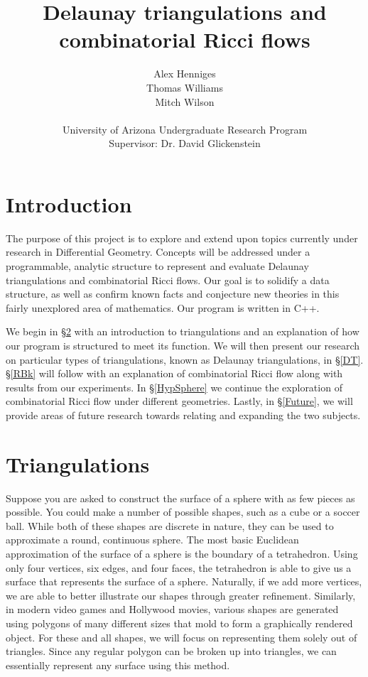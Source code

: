 \documentclass[12pt]{article}
\title{Delaunay triangulations and combinatorial Ricci flows}
\author{Alex Henniges \\ Thomas Williams \\ Mitch Wilson \\ \\ University of Arizona Undergraduate Research Program\\
Supervisor: Dr. David Glickenstein\\
}
\begin{document}
\maketitle
\thispagestyle{empty}
\newpage
\renewcommand\contentsname{Table of Contents}
\tableofcontents

\newpage
\section{Introduction}

The purpose of this project is to explore and extend upon topics currently under research in Differential Geometry. Concepts will be addressed under a programmable, analytic structure to represent and evaluate Delaunay triangulations and combinatorial Ricci flows. Our goal is to solidify a data structure, as well as confirm known facts and conjecture new theories in this fairly unexplored area of mathematics. Our program is written in C++.\newline

 We begin in \S\ref{Triangulationschap} with an introduction to triangulations and an explanation of how our program is structured to meet its function. We will then present our research on particular types of triangulations, known as Delaunay triangulations, in \S\ref{DT}. \S\ref{RBk} will follow with an explanation of combinatorial Ricci flow along with results from our experiments. In \S\ref{HypSphere} we continue the exploration of combinatorial Ricci flow under different geometries. Lastly, in \S\ref{Future}, we will provide areas of future research towards relating and expanding the two subjects.

\section{Triangulations}
\label{Triangulationschap}

Suppose you are asked to construct the surface of a sphere with as few pieces as possible. You could make a number of possible shapes, such as a cube or a soccer ball. While both of these shapes are discrete in nature, they can be used to approximate a round, continuous sphere. The most basic Euclidean approximation of the surface of a sphere is the boundary of a tetrahedron. Using only four vertices, six edges, and four faces, the tetrahedron is able to give us a surface that represents the surface of a sphere. Naturally, if we add more vertices, we are able to better illustrate our shapes through greater refinement. Similarly, in modern video games and Hollywood movies, various shapes are generated using polygons of many different sizes that mold to form a graphically rendered object. For these and all shapes, we will focus on representing them solely out of triangles. Since any regular polygon can be broken up into triangles, we can essentially represent any surface using this method. \newline
\end{document}
